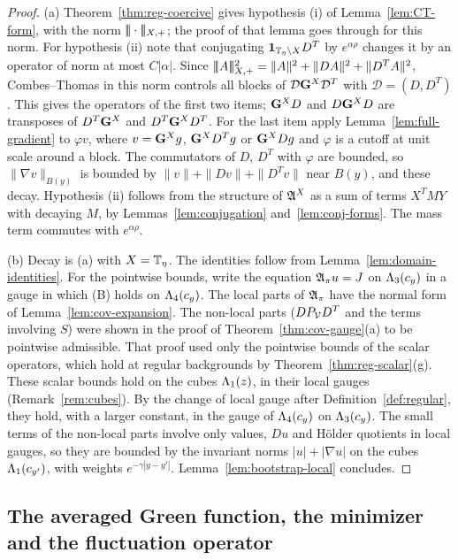 \begin{proof}
(a) Theorem~\ref{thm:reg-coercive} gives hypothesis (i) of Lemma~\ref{lem:CT-form}, with the norm $|\!|\!|\cdot|\!|\!|_{X,+}$; the proof of that lemma goes through for this norm. For hypothesis (ii) note that conjugating $\mathbf 1_{\mathbb T_\eta\setminus X}D^T$ by $e^{\alpha\rho}$ changes it by an operator of norm at most $C|\alpha|$. Since $|\!|\!|A|\!|\!|_{X,+}^2=\|A\|^2+\|DA\|^2+\|D^TA\|^2$, Combes--Thomas in this norm controls all blocks of $\mathcal D\mathbf G^X\mathcal D^T$ with $\mathcal D=(D,D^T)$. This gives the operators of the first two items; $\mathbf G^XD$ and $D\mathbf G^XD$ are transposes of $D^T\mathbf G^X$ and $D^T\mathbf G^XD^T$. For the last item apply Lemma~\ref{lem:full-gradient} to $\varphi v$, where $v=\mathbf G^Xg$, $\mathbf G^XD^Tg$ or $\mathbf G^XDg$ and $\varphi$ is a cutoff at unit scale around a block. The commutators of $D$, $D^T$ with $\varphi$ are bounded, so $\|\nabla v\|_{B(y)}$ is bounded by $\|v\|+\|Dv\|+\|D^Tv\|$ near $B(y)$, and these decay. Hypothesis (ii) follows from the structure of $\mathfrak A^X$ as a sum of terms $X^TMY$ with decaying $M$, by Lemmas~\ref{lem:conjugation} and~\ref{lem:conj-forms}. The mass term commutes with $e^{\alpha\rho}$.

(b) Decay is (a) with $X=\mathbb T_\eta$. The identities follow from Lemma~\ref{lem:domain-identities}. For the pointwise bounds, write the equation $\mathfrak A_\pi u=J$ on $\Lambda_3(c_y)$ in a gauge in which (B) holds on $\Lambda_4(c_y)$. The local parts of $\mathfrak A_\pi$ have the normal form of Lemma~\ref{lem:cov-expansion}. The non-local parts ($DP_\mathcal V D^T$ and the terms involving $S$) were shown in the proof of Theorem~\ref{thm:cov-gauge}(a) to be pointwise admissible. That proof used only the pointwise bounds of the scalar operators, which hold at regular backgrounds by Theorem~\ref{thm:reg-scalar}(g). These scalar bounds hold on the cubes $\Lambda_1(z)$, in their local gauges (Remark~\ref{rem:cubes}). By the change of local gauge after Definition~\ref{def:regular}, they hold, with a larger constant, in the gauge of $\Lambda_4(c_y)$ on $\Lambda_3(c_y)$. The small terms of the non-local parts involve only values, $Du$ and H\"older quotients in local gauges, so they are bounded by the invariant norms $|u|+|\nabla u|$ on the cubes $\Lambda_1(c_{y'})$, with weights $e^{-\gamma|y-y'|}$. Lemma~\ref{lem:bootstrap-local} concludes.
\end{proof}

\subsection{The averaged Green function, the minimizer and the fluctuation operator}\label{ss:19.4}

